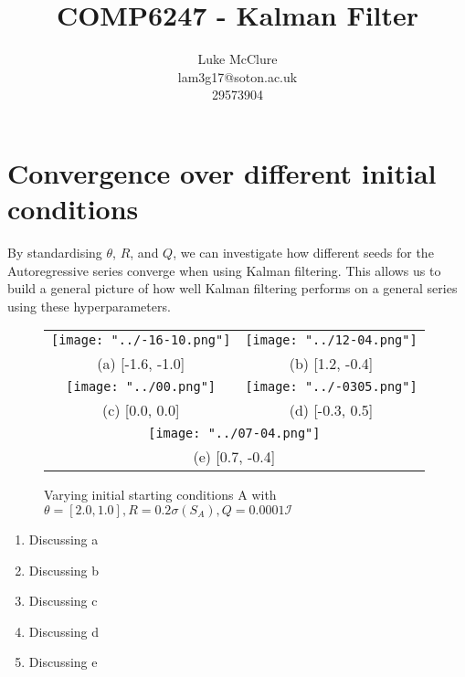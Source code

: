 \documentclass[sigconf]{acmart}
\begin{document}
\title{COMP6247 - Kalman Filter}
\author{Luke McClure \\ lam3g17@soton.ac.uk \\ 29573904}

\maketitle

\pagestyle{myheadings} 
\section{Convergence over different initial conditions}
By standardising $\theta$, $R$, and $Q$, we can investigate how different seeds for the Autoregressive series converge when using Kalman filtering. This allows us to build a general picture of how well Kalman filtering performs on a general series using these hyperparameters. 

\begin{figure}[h]
  \centering
    \begin{tabular}{cc}
      \texttt{[image: "../-16-10.png"]} &   \texttt{[image: "../12-04.png"]} \\
    (a) [-1.6, -1.0] & (b) [1.2, -0.4] \\[6pt]
     \texttt{[image: "../00.png"]} &   \texttt{[image: "../-0305.png"]} \\
    (c) [0.0, 0.0] & (d) [-0.3, 0.5] \\[6pt]
    \multicolumn{2}{c}{\texttt{[image: "../07-04.png"]} }\\
    \multicolumn{2}{c}{(e) [0.7, -0.4]}
    \end{tabular}
    \caption{Varying initial starting conditions A with $ \theta = [2.0, 1.0], R = 0.2\sigma(S_{A}), Q = 0.0001\mathcal{I}  $}
    \label{fig:initconditions}
  \end{figure}

\begin{enumerate}[label=\alph*]
  \item Discussing a
  \item Discussing b 
  \item Discussing c 
  \item Discussing d 
  \item Discussing e
\end{enumerate}
\end{document}
